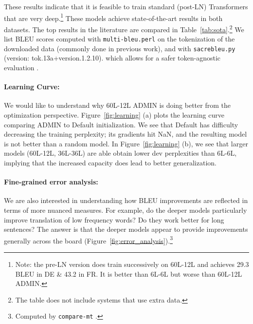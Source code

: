These results indicate that it is feasible to train standard (post-LN) Transformers that are very deep.\footnote{Note: the pre-LN version does train successively on 60L-12L and achieves 29.3 BLEU in DE \& 43.2 in FR. It is better than 6L-6L but worse than 60L-12L ADMIN.}
These models achieve state-of-the-art results in both datasets. The top results in the literature are compared in Table~\ref{tab:sota}.\footnote{The table does not include systems that use extra data.} We list BLEU scores computed with \texttt{multi-bleu.perl} on the tokenization of the downloaded data (commonly done in previous work), and with \texttt{sacrebleu.py} (version: tok.13a+version.1.2.10). which allows for a safer token-agnostic evaluation \cite{post2018sacrebleu}. 


\paragraph{Learning Curve:}

We would like to understand why 60L-12L ADMIN is doing better from the optimization perspective. 
Figure~\ref{fig:learning} (a) plots the learning curve comparing ADMIN to Default initialization. We see that Default has difficulty decreasing the training perplexity; its gradients hit NaN, and the resulting model is not better than a random model.
In Figure~\ref{fig:learning} (b), we see that larger models (60L-12L, 36L-36L) are able obtain lower dev perplexities than 6L-6L, implying that the increased capacity does lead to better generalization.


\paragraph{Fine-grained error analysis:}
We are also interested in understanding how BLEU improvements are reflected in terms of more nuanced measures. For example, do the deeper models particularly improve translation of low frequency words?  Do they work better for long sentences? The answer is that the deeper models appear to provide improvements generally across the board (Figure~\ref{fig:error_analysis}).\footnote{Computed by \texttt{compare-mt} \cite{neubig2019-compare-nmt}.}


%
%


